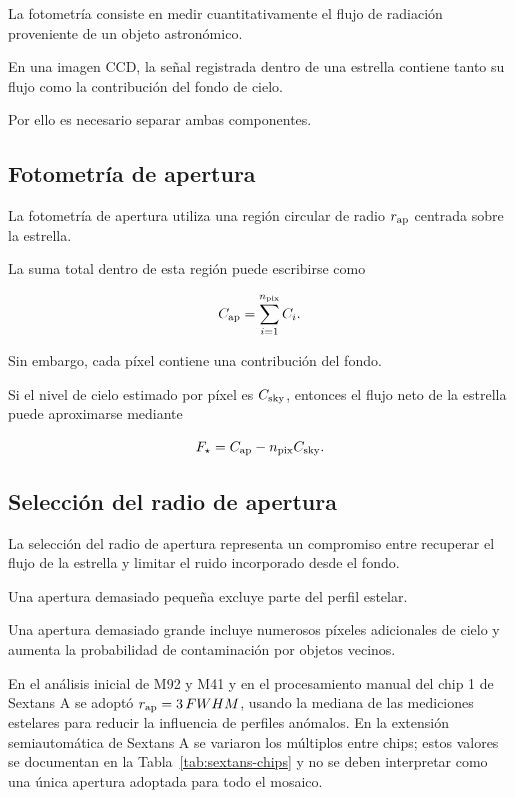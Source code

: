 \documentclass[12pt,letterpaper,oneside]{book}
\begin{document}
La fotometría consiste en medir cuantitativamente el flujo de radiación proveniente de un objeto astronómico.

En una imagen CCD, la señal registrada dentro de una estrella contiene tanto su flujo como la contribución del fondo de cielo.

Por ello es necesario separar ambas componentes.



\subsection{Fotometría de apertura}

La fotometría de apertura utiliza una región circular de radio $r_{\rm ap}$ centrada sobre la estrella.

La suma total dentro de esta región puede escribirse como

\[
C_{\rm ap}
=
\sum_{i=1}^{n_{\rm pix}} C_i.
\]

Sin embargo, cada píxel contiene una contribución del fondo.

Si el nivel de cielo estimado por píxel es $C_{\rm sky}$, entonces el flujo neto de la estrella puede aproximarse mediante

\begin{equation}
F_{\star}
=
C_{\rm ap}
-
n_{\rm pix} C_{\rm sky}.
\end{equation}



\subsection{Selección del radio de apertura}

La selección del radio de apertura representa un compromiso entre recuperar el flujo de la estrella y limitar el ruido incorporado desde el fondo.

Una apertura demasiado pequeña excluye parte del perfil estelar.

Una apertura demasiado grande incluye numerosos píxeles adicionales de cielo y aumenta la probabilidad de contaminación por objetos vecinos.

En el análisis inicial de M92 y M41 y en el procesamiento manual del chip 1 de Sextans A se adoptó $r_{\rm ap}=3\,FWHM$, usando la mediana de las mediciones estelares para reducir la influencia de perfiles anómalos. En la extensión semiautomática de Sextans A se variaron los múltiplos entre chips; estos valores se documentan en la Tabla~\ref{tab:sextans-chips} y no se deben interpretar como una única apertura adoptada para todo el mosaico.
\end{document}
